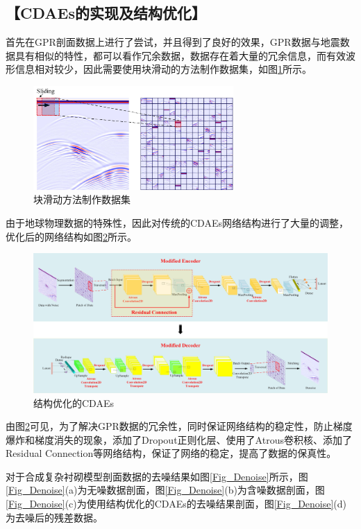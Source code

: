 \documentclass[11pt]{article}
\newcommand{\kai}{\CJKfamily{kai}}
\begin{document}
\subsection*{\kai\fontsize{11pt}{10pt} \selectfont【CDAEs的实现及结构优化】}
首先在GPR剖面数据上进行了尝试，并且得到了良好的效果，GPR数据与地震数据具有相似的特性，都可以看作冗余数据，数据存在着大量的冗余信息，而有效波形信息相对较少，因此需要使用块滑动的方法制作数据集，如图\ref{Fig_How2GetPatch}所示。
\par
\begin{figure}[htbp]
\centering
\includegraphics[width=3in]{./FigureFolder/Foundation/CDAEs/How2GetPatch.pdf}
\caption{块滑动方法制作数据集}
\label{Fig_How2GetPatch}
\end{figure}
\par
由于地球物理数据的特殊性，因此对传统的CDAEs网络结构进行了大量的调整，优化后的网络结构如图\ref{Fig_ConstructionOfResCDAEs}所示。
\begin{figure}[htbp]
\centering
\includegraphics[width=5.5in]{./FigureFolder/Foundation/CDAEs/ConstructionOfResCDAEs.pdf}
\caption{结构优化的CDAEs}
\label{Fig_ConstructionOfResCDAEs}
\end{figure}
\par
由图\ref{Fig_ConstructionOfResCDAEs}可见，为了解决GPR数据的冗余性，同时保证网络结构的稳定性，防止梯度爆炸和梯度消失的现象，添加了Dropout正则化层、使用了Atrous卷积核、添加了Residual Connection等网络结构，保证了网络的稳定，提高了数据的保真性。
\par
对于合成复杂衬砌模型剖面数据的去噪结果如图\ref{Fig_Denoise}所示，图\ref{Fig_Denoise}(a)为无噪数据剖面，图\ref{Fig_Denoise}(b)为含噪数据剖面，图\ref{Fig_Denoise}(c)为使用结构优化的CDAEs的去噪结果剖面，图\ref{Fig_Denoise}(d)为去噪后的残差数据。
\end{document}
